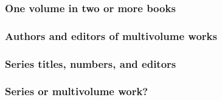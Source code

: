\documentclass[11pt,letterpaper,oneside]{article}
\begin{document}

\setcounter{subsubsection}{120}
\subsubsection{One volume in two or more books}

\begin{citebib}
\item \cite[351]{lach1977}
\item \cite{harley1994}
\end{citebib}

\subsubsection{Authors and editors of multivolume works}

\begin{citebib}
\item \cite{barrows1959}
\item \cite{donne1995}
\end{citebib}

\subsubsection{Series titles, numbers, and editors}
\label{14.123}

\begin{citebib}
\item \cite{lei2014}
\item \cite{mazrim2011}
\item \cite{wauchope1950}
\item \cite{allen2009}
\end{citebib}

\subsubsection{Series or multivolume work?}

\begin{citebib}
\item \cite{boyer1986}
\item \cite{cochrane1987}
\end{citebib}
\end{document}
